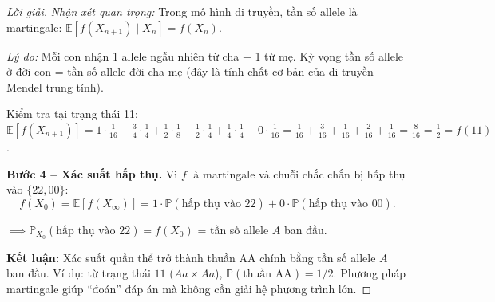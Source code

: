 \documentclass[8pt,a4paper]{article}
\newenvironment{solution}{\begin{proof}[Lời giải]}{\end{proof}}
\newcommand{\prob}{\mathbb{P}}
\newcommand{\E}{\mathbb{E}}
\begin{document}
\begin{solution}
\textit{Nhận xét quan trọng:} Trong mô hình di truyền, tần số allele là martingale: $\E[f(X_{n+1}) \mid X_n] = f(X_n)$.

\textit{Lý do:} Mỗi con nhận 1 allele ngẫu nhiên từ cha + 1 từ mẹ. Kỳ vọng tần số allele ở đời con = tần số allele đời cha mẹ (đây là tính chất cơ bản của di truyền Mendel trung tính).

Kiểm tra tại trạng thái 11: $\E[f(X_{n+1})] = 1 \cdot \frac{1}{16} + \frac{3}{4} \cdot \frac{1}{4} + \frac{1}{2} \cdot \frac{1}{8} + \frac{1}{2} \cdot \frac{1}{4} + \frac{1}{4} \cdot \frac{1}{4} + 0 \cdot \frac{1}{16} = \frac{1}{16} + \frac{3}{16} + \frac{1}{16} + \frac{2}{16} + \frac{1}{16} = \frac{8}{16} = \frac{1}{2} = f(11)$. \checkmark

\textbf{Bước 4 -- Xác suất hấp thụ.}
Vì $f$ là martingale và chuỗi chắc chắn bị hấp thụ vào $\{22, 00\}$:
\[
  f(X_0) = \E[f(X_\infty)] = 1 \cdot \prob(\text{hấp thụ vào } 22) + 0 \cdot \prob(\text{hấp thụ vào } 00).
\]

$\implies \prob_{X_0}(\text{hấp thụ vào } 22) = f(X_0)$ = tần số allele $A$ ban đầu.

\textbf{Kết luận:} Xác suất quần thể trở thành thuần AA chính bằng tần số allele $A$ ban đầu. Ví dụ: từ trạng thái $11$ ($Aa \times Aa$), $\prob(\text{thuần AA}) = 1/2$. Phương pháp martingale giúp ``đoán'' đáp án mà không cần giải hệ phương trình lớn.
\end{solution}
\end{document}
